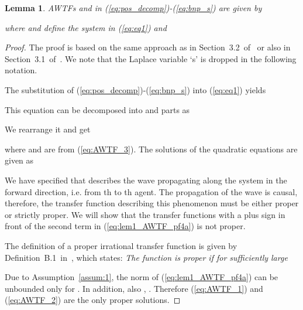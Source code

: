 \documentclass[10pt,twocolumn,twoside]{IEEEtran}
\newtheorem{lemma}{Lemma}
\theoremstyle{definition}
\newcommand{\revB}{Black}
\begin{document}
\begin{lemma}\label{lem:AWTF}
AWTFs  and  in (\ref{eq:pos_decomp})-(\ref{eq:bnp_s}) are given by

where  and  define the system in (\ref{eq:eq1}) and

\end{lemma}
\begin{proof}
The proof is based on the same approach as in Section~3.2~of~\cite{Martinec2014a} or also in Section~3.1~of~\cite{OConnor2006}. We note that the Laplace variable `s' is dropped in the following notation.

The substitution of (\ref{eq:pos_decomp})-(\ref{eq:bnp_s}) into (\ref{eq:eq1}) yields

This equation can be decomposed into  and  parts as

We rearrange it and get

where  and  are from (\ref{eq:AWTF_3}). The solutions of the quadratic equations are given as


We have specified that  describes the wave propagating along the system in the forward direction, i.e. from th to th agent. The propagation of the wave is causal, therefore, the transfer function describing this phenomenon must be either proper or strictly proper. We will show that the transfer functions  with a plus sign in front of the second term in (\ref{eq:lem1_AWTF_pf4a}) is not proper.

The definition of a proper irrational transfer function is given by Definition~B.1~in~\cite{Curtain2009}, which states: \emph{The function  is proper if for sufficiently large 
}

Due to Assumption~\ref{assum:1}, the norm of (\ref{eq:lem1_AWTF_pf4a}) can be unbounded only for . In addition, also , . Therefore {\color{\revB} (\ref{eq:AWTF_1}) and (\ref{eq:AWTF_2}) are the only proper solutions.}





\end{proof}
\end{document}
